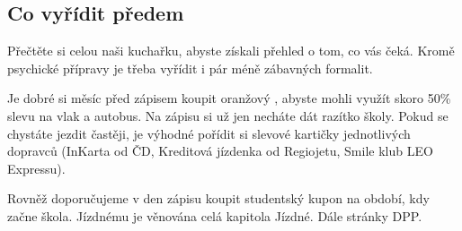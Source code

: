 \subsection{Co vyřídit předem}
Přečtěte si celou naši kuchařku, abyste získali přehled o tom, co vás čeká.
Kromě psychické přípravy je třeba vyřídit i pár méně zábavných formalit.

Je dobré si měsíc před zápisem koupit oranžový , abyste mohli
využít skoro 50\% slevu na vlak a autobus. Na zápisu si už jen necháte dát
razítko školy. Pokud se chystáte jezdit častěji, je výhodné pořídit si slevové
kartičky jednotlivých dopravců (InKarta od ČD, Kreditová jízdenka od Regiojetu,
Smile klub LEO Expressu).

Rovněž doporučujeme v den zápisu koupit studentský kupon na období, kdy začne
škola. Jízdnému je věnována celá kapitola Jízdné. Dále stránky DPP.